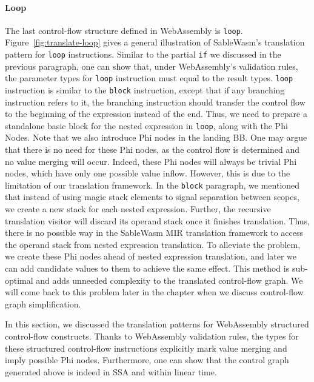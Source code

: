 \paragraph{Loop} The last control-flow structure defined in WebAssembly is \texttt{loop}. Figure~\ref{fig:translate-loop} gives a general illustration of SableWasm's translation pattern for \texttt{loop} instructions. Similar to the partial \texttt{if} we discussed in the previous paragraph, one can show that, under WebAssembly's validation rules, the parameter types for \texttt{loop} instruction must equal to the result types. \texttt{loop} instruction is similar to the \texttt{block} instruction, except that if any branching instruction refers to it, the branching instruction should transfer the control flow to the beginning of the expression instead of the end. Thus, we need to prepare a standalone basic block for the nested expression in \texttt{loop}, along with the Phi Nodes. Note that we also introduce Phi nodes in the landing BB. One may argue that there is no need for these Phi nodes, as the control flow is determined and no value merging will occur. Indeed, these Phi nodes will always be trivial Phi nodes, which have only one possible value inflow. However, this is due to the limitation of our translation framework. In the \texttt{block} paragraph, we mentioned that instead of using magic stack elements to signal separation between scopes, we create a new stack for each nested expression. Further, the recursive translation visitor will discard its operand stack once it finishes translation. Thus, there is no possible way in the SableWasm MIR translation framework to access the operand stack from nested expression translation. To alleviate the problem, we create these Phi nodes ahead of nested expression translation, and later we can add candidate values to them to achieve the same effect. This method is sub-optimal and adds unneeded complexity to the translated control-flow graph. We will come back to this problem later in the chapter when we discuss control-flow graph simplification.

In this section, we discussed the translation patterns for WebAssembly structured control-flow constructs. Thanks to WebAssembly validation rules, the types for these structured control-flow instructions explicitly mark value merging and imply possible Phi nodes. Furthermore,  one can show that the control graph generated above is indeed in SSA and within linear time.